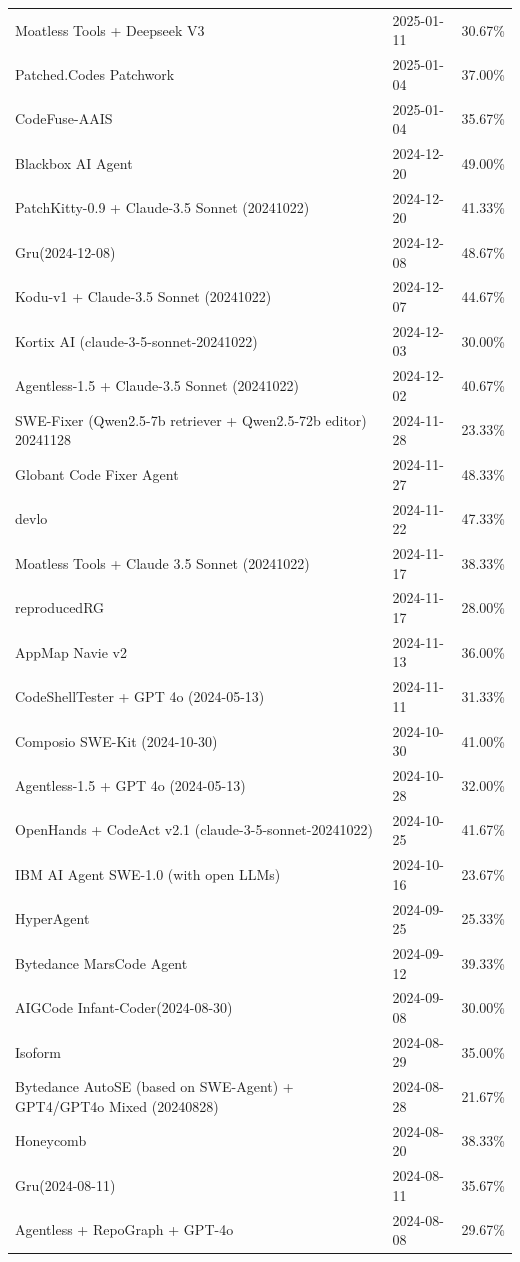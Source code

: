\documentclass[UTF8,a4paper,11pt]{ctexart}
\begin{document}
\begin{center}
{\begin{longtable}{L{10.1cm} C{1.7cm} C{1.8cm}}
Moatless Tools + Deepseek V3 & 2025-01-11 & 30.67\% \\
Patched.Codes Patchwork & 2025-01-04 & 37.00\% \\
CodeFuse-AAIS & 2025-01-04 & 35.67\% \\
Blackbox AI Agent & 2024-12-20 & 49.00\% \\
PatchKitty-0.9 + Claude-3.5 Sonnet (20241022) & 2024-12-20 & 41.33\% \\
Gru(2024-12-08) & 2024-12-08 & 48.67\% \\
Kodu-v1 + Claude-3.5 Sonnet (20241022) & 2024-12-07 & 44.67\% \\
Kortix AI (claude-3-5-sonnet-20241022) & 2024-12-03 & 30.00\% \\
Agentless-1.5 + Claude-3.5 Sonnet (20241022) & 2024-12-02 & 40.67\% \\
SWE-Fixer (Qwen2.5-7b retriever + Qwen2.5-72b editor) 20241128 & 2024-11-28 & 23.33\% \\
Globant Code Fixer Agent & 2024-11-27 & 48.33\% \\
devlo & 2024-11-22 & 47.33\% \\
Moatless Tools + Claude 3.5 Sonnet (20241022) & 2024-11-17 & 38.33\% \\
reproducedRG & 2024-11-17 & 28.00\% \\
AppMap Navie v2 & 2024-11-13 & 36.00\% \\
CodeShellTester + GPT 4o (2024-05-13) & 2024-11-11 & 31.33\% \\
Composio SWE-Kit (2024-10-30) & 2024-10-30 & 41.00\% \\
Agentless-1.5 + GPT 4o (2024-05-13) & 2024-10-28 & 32.00\% \\
OpenHands + CodeAct v2.1 (claude-3-5-sonnet-20241022) & 2024-10-25 & 41.67\% \\
IBM AI Agent SWE-1.0 (with open LLMs) & 2024-10-16 & 23.67\% \\
HyperAgent & 2024-09-25 & 25.33\% \\
Bytedance MarsCode Agent & 2024-09-12 & 39.33\% \\
AIGCode Infant-Coder(2024-08-30) & 2024-09-08 & 30.00\% \\
Isoform & 2024-08-29 & 35.00\% \\
Bytedance AutoSE (based on SWE-Agent) + GPT4/GPT4o Mixed (20240828) & 2024-08-28 & 21.67\% \\
Honeycomb & 2024-08-20 & 38.33\% \\
Gru(2024-08-11) & 2024-08-11 & 35.67\% \\
Agentless + RepoGraph + GPT-4o & 2024-08-08 & 29.67\% \\

\end{longtable}}
\end{center}
\end{document}
